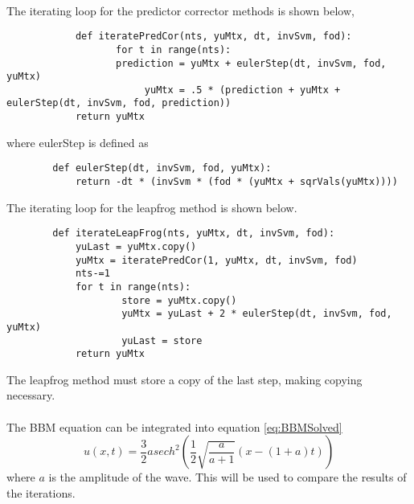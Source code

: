\documentclass[a4paper,12pt]{article}
\begin{document}
	\paragraph*{}
		The iterating loop for the predictor corrector methods is shown below,
		\begin{verbatim}
			def iteratePredCor(nts, yuMtx, dt, invSvm, fod):
				   for t in range(nts):
			       prediction = yuMtx + eulerStep(dt, invSvm, fod, yuMtx)
				      	yuMtx = .5 * (prediction + yuMtx + eulerStep(dt, invSvm, fod, prediction))
			return yuMtx
		\end{verbatim}
		where eulerStep is defined as 
		\begin{verbatim}
		def eulerStep(dt, invSvm, fod, yuMtx):
	   		return -dt * (invSvm * (fod * (yuMtx + sqrVals(yuMtx))))

		\end{verbatim}
		The iterating loop for the leapfrog method is shown below.
		\begin{verbatim}
		def iterateLeapFrog(nts, yuMtx, dt, invSvm, fod):
		   	yuLast = yuMtx.copy()
		   	yuMtx = iteratePredCor(1, yuMtx, dt, invSvm, fod)
		   	nts-=1
		   	for t in range(nts):
		      		store = yuMtx.copy()
			      	yuMtx = yuLast + 2 * eulerStep(dt, invSvm, fod, yuMtx)
			      	yuLast = store
			return yuMtx
		\end{verbatim}
		The leapfrog method must store a copy of the last step, making copying necessary. 
	\paragraph*{} 
		The BBM equation can be integrated into equation \ref{eq:BBMSolved}
		\begin{equation}
			\label{eq:BBMSolved}
			u(x, t) = \frac{3}{2}asech^{2}(\frac{1}{2}\sqrt{\frac{a}{a+1}}(x-(1+a)t))
		\end{equation}
		where $a$ is the amplitude of the wave.  This will be used to compare the results of the iterations.
\end{document}
